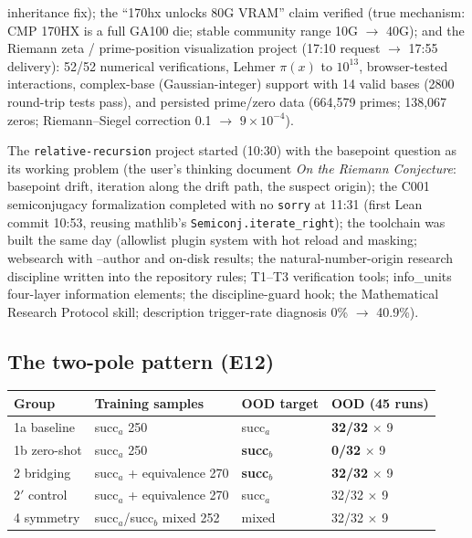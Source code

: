 \documentclass[sigplan,10pt,anonymous,review]{acmart}
\begin{document}
\begin{description}
inheritance fix); the ``170hx unlocks 80G VRAM'' claim verified (true
mechanism: CMP 170HX is a full GA100 die; stable community range 10G
$\to$ 40G); and the Riemann zeta / prime-position visualization project
(17:10 request $\to$ 17:55 delivery): 52/52 numerical verifications,
Lehmer $\pi(x)$ to $10^{13}$, browser-tested interactions, complex-base
(Gaussian-integer) support with 14 valid bases (2800 round-trip tests
pass), and persisted prime/zero data (664{,}579 primes; 138{,}067 zeros;
Riemann--Siegel correction 0.1 $\to$ $9\times10^{-4}$).
\item[08-07 --- basepoint-movement research launch + first Lean
no-\texttt{sorry} (21 entries).] The \texttt{relative-recursion} project
started (10:30) with the basepoint question as its working problem (the
user's thinking document \emph{On the Riemann Conjecture}: basepoint
drift, iteration along the drift path, the suspect origin); the C001
semiconjugacy formalization completed with no \texttt{sorry} at 11:31
(first Lean commit 10:53, reusing mathlib's
\texttt{Semiconj.iterate\_right}); the toolchain was built the same day
(allowlist plugin system with hot reload and masking; websearch with
--author and on-disk results; the natural-number-origin research
discipline written into the repository rules; T1--T3 verification tools;
info\_units four-layer information elements; the discipline-guard hook;
the Mathematical Research Protocol skill; description trigger-rate
diagnosis 0\% $\to$ 40.9\%).
\end{description}

\subsection{The two-pole pattern (E12)}

\begin{center}
\small
\begin{tabular}{llll}
\toprule
Group & Training samples & OOD target & OOD (45 runs) \\
\midrule
1a baseline & succ$_a$ 250 & succ$_a$ & \textbf{32/32} $\times$ 9 \\
1b zero-shot & succ$_a$ 250 & \textbf{succ$_b$} & \textbf{0/32} $\times$ 9 \\
2 bridging & succ$_a$ + equivalence 270 & \textbf{succ$_b$} & \textbf{32/32} $\times$ 9 \\
2$'$ control & succ$_a$ + equivalence 270 & succ$_a$ & 32/32 $\times$ 9 \\
4 symmetry & succ$_a$/succ$_b$ mixed 252 & mixed & 32/32 $\times$ 9 \\
\bottomrule
\end{tabular}
\end{center}
\end{document}
